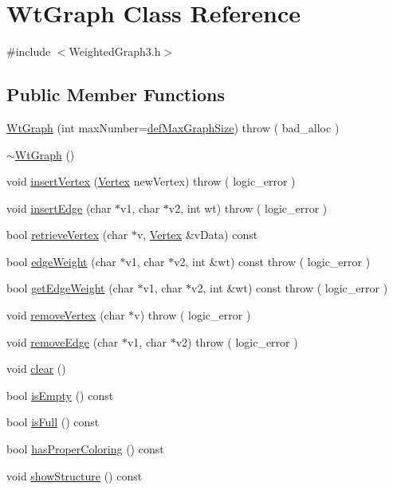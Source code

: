 \hypertarget{class_wt_graph}{\section{\-Wt\-Graph \-Class \-Reference}
\label{class_wt_graph}
}


{\ttfamily \#include $<$\-Weighted\-Graph3.\-h$>$}

\subsection*{\-Public \-Member \-Functions}
\begin{DoxyCompactItemize}
\item 
\hyperlink{class_wt_graph_a24922964bd1ddc86cef3ae0cc42d388d}{\-Wt\-Graph} (int max\-Number=\hyperlink{_weighted_graph3_8h_a5a62135a2c33201a5b5d22eda348cbcb}{def\-Max\-Graph\-Size})  throw ( bad\-\_\-alloc )
\item 
\hyperlink{class_wt_graph_aa03cf442d9dfb33e3d0511d68b4d2a3a}{$\sim$\-Wt\-Graph} ()
\item 
void \hyperlink{class_wt_graph_a4ca3eb343548c81ca24fef7de7536437}{insert\-Vertex} (\hyperlink{class_vertex}{\-Vertex} new\-Vertex)  throw ( logic\-\_\-error )
\item 
void \hyperlink{class_wt_graph_aea0e33832423083bd5d532dc04ca1dff}{insert\-Edge} (char $\ast$v1, char $\ast$v2, int wt)  throw ( logic\-\_\-error )
\item 
bool \hyperlink{class_wt_graph_aee1b743d73b67a832e30c8603c9f2a0e}{retrieve\-Vertex} (char $\ast$v, \hyperlink{class_vertex}{\-Vertex} \&v\-Data) const 
\item 
bool \hyperlink{class_wt_graph_ac20ca5b112adb5403f50caf99e4ee8bd}{edge\-Weight} (char $\ast$v1, char $\ast$v2, int \&wt) const   throw ( logic\-\_\-error )
\item 
bool \hyperlink{class_wt_graph_afa768b2bfd49e68c1970e479cab00036}{get\-Edge\-Weight} (char $\ast$v1, char $\ast$v2, int \&wt) const   throw ( logic\-\_\-error )
\item 
void \hyperlink{class_wt_graph_aaabd4ba894d1c4251479837b1d0a0a78}{remove\-Vertex} (char $\ast$v)  throw ( logic\-\_\-error )
\item 
void \hyperlink{class_wt_graph_a7a1e566285ce7faefd211ba0d9ffa864}{remove\-Edge} (char $\ast$v1, char $\ast$v2)  throw ( logic\-\_\-error )
\item 
void \hyperlink{class_wt_graph_ad73f37d58e6e5132fbf6191b35e54e4e}{clear} ()
\item 
bool \hyperlink{class_wt_graph_ad521755a01e89cfd9e6cb4f3f0b8393b}{is\-Empty} () const 
\item 
bool \hyperlink{class_wt_graph_a2afac3672a8dd457da6dccc899e0a7f9}{is\-Full} () const 
\item 
bool \hyperlink{class_wt_graph_aad6215139213038e86eb7da9a3d6d2e6}{has\-Proper\-Coloring} () const 
\item 
void \hyperlink{class_wt_graph_aff09483a06de871dab7be3b5fb6a9f51}{show\-Structure} () const 
\end{DoxyCompactItemize}
